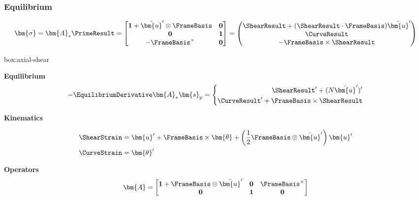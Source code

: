 \subsubsection{Equilibrium}

$$
\bm{\sigma} = \bm{A}_* \PrimeResult
= \begin{bmatrix}
\mathbf{1} + \bar{\bm{u}}^{\prime}\otimes\FrameBasis & \mathbf{0} \\
\mathbf{0} & \mathbf{1} \\
-\FrameBasis^{\times} & \mathbf{0}
\end{bmatrix}
=\begin{pmatrix}
\ShearResult + (\ShearResult\cdot\FrameBasis )\bar{\bm{u}}^{\prime} \\
\CurveResult \\
-\FrameBasis\times\ShearResult
\end{pmatrix}
$$

\begin{ambox}{box:axial-shear}

\textbf{Equilibrium}
$$
- \EquilibriumDerivative \bm{A}_* \bm{s}_{\mathrm{p}} = \left\{\begin{aligned}
\ShearResult^{\prime} + (N \bar{\bm{u}}^{\prime})^{\prime} \\
\CurveResult^{\prime} + \FrameBasis\times \ShearResult
\end{aligned}
\right.
$$

\textbf{Kinematics}

$$
\begin{aligned}
\ShearStrain &= \bm{u}^{\prime} + \FrameBasis\times\bm{\theta} + \left(\frac{1}{2}\FrameBasis\otimes\bar{\bm{u}}^{\prime}\right)\bm{u}^{\prime} \\
\CurveStrain &= \bm{\theta}^{\prime}
\end{aligned}
$$

\textbf{Operators}
\begin{equation*}
\bm{A} = \begin{bmatrix}
\mathbf{1} + \FrameBasis\otimes\bar{\bm{u}}^{\prime} & \mathbf{0} & \FrameBasis^{\times} \\
\mathbf{0} & \mathbf{1} & \mathbf{0}
\end{bmatrix}
\end{equation*}

\end{ambox}
